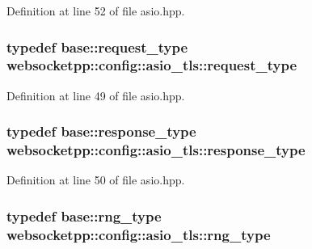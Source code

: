 Definition at line 52 of file asio.\+hpp.

\hypertarget{structwebsocketpp_1_1config_1_1asio__tls_a8435d19caaed4858faa88cae4bc46a81}{}
\subsubsection[{request\+\_\+type}]{\setlength{\rightskip}{0pt plus 5cm}typedef {\bf base\+::request\+\_\+type} {\bf websocketpp\+::config\+::asio\+\_\+tls\+::request\+\_\+type}}\label{structwebsocketpp_1_1config_1_1asio__tls_a8435d19caaed4858faa88cae4bc46a81}


Definition at line 49 of file asio.\+hpp.

\hypertarget{structwebsocketpp_1_1config_1_1asio__tls_ad6c59e6090c5e66d0a9e15f4f6063631}{}
\subsubsection[{response\+\_\+type}]{\setlength{\rightskip}{0pt plus 5cm}typedef {\bf base\+::response\+\_\+type} {\bf websocketpp\+::config\+::asio\+\_\+tls\+::response\+\_\+type}}\label{structwebsocketpp_1_1config_1_1asio__tls_ad6c59e6090c5e66d0a9e15f4f6063631}


Definition at line 50 of file asio.\+hpp.

\hypertarget{structwebsocketpp_1_1config_1_1asio__tls_a4d32d1651cb937c392c4eed71034752e}{}
\subsubsection[{rng\+\_\+type}]{\setlength{\rightskip}{0pt plus 5cm}typedef {\bf base\+::rng\+\_\+type} {\bf websocketpp\+::config\+::asio\+\_\+tls\+::rng\+\_\+type}}\label{structwebsocketpp_1_1config_1_1asio__tls_a4d32d1651cb937c392c4eed71034752e}


